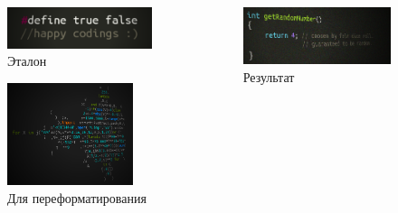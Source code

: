 \documentclass[sans]{beamer}
\begin{document}
\begin{frame}{}
	\begin{columns}[T]
		\begin{column}{.5\textwidth}
			\begin{figure}
				\includegraphics[width = \linewidth]{images/trueFalse.png}
				\caption{Эталон}
			\end{figure}
			\begin{figure}
				\includegraphics[height = 3cm, width = \linewidth]{images/mandel.png}
				\caption{Для переформатирования}
			\end{figure}
		\end{column}

		\pause

		\begin{column}{.5\textwidth}
			\begin{minipage}[c][0.8\textheight][c]{\linewidth}
				\begin{figure}[c]
					\includegraphics[width = \linewidth]{images/rand.png}
					\caption{Результат}
				\end{figure}
			\end{minipage}

		\end{column}
	\end{columns}
\end{frame}
\end{document}
